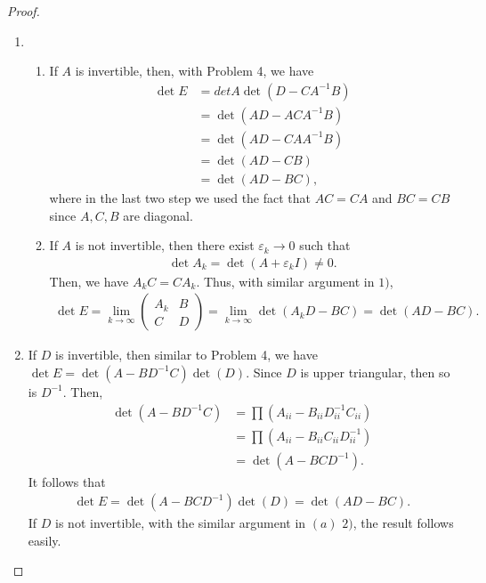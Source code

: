 \documentclass[12pt]{article}
\begin{document}
\begin{proof}
~\begin{enumerate}[label=(\alph*)]
    \item
    \begin{enumerate}[label=\arabic*)]
        \item If $A$ is invertible, then, with Problem 4, we have
        \begin{align*}
            \det E & = det A \det \left( D - C A^{-1} B\right) \\
            & = \det \left(AD - A C A^{-1} B\right) \\
            & = \det \left(AD - C A A^{-1} B\right) \\
            & = \det \left(AD - CB\right)\\
            & = \det \left(AD - BC\right),
        \end{align*}
        where in the last two step we used the fact that $AC = CA$ and $BC = CB$ since $A,C,B$ are diagonal.
        \item If $A$ is not invertible, then there exist $\varepsilon_k \to 0$ such that
        \begin{align*}
            \det A_k = \det (A + \varepsilon_k I) \neq 0.
        \end{align*}
        Then, we have $A_k C = CA_k$. Thus, with similar argument in $1)$,
        \begin{align*}
            \det E = \lim_{k\to \infty} \begin{pmatrix}
            A_k & B \\
            C & D
        \end{pmatrix} = \lim_{k\to\infty} \det \left(A_k D - BC\right) = \det \left(AD - BC\right).
        \end{align*}
    \end{enumerate}

    \item If $D$ is invertible, then similar to Problem 4, we have $\det E = \det (A-BD^{-1}C)\det(D)$. Since $D$ is upper triangular, then so is $D^{-1}$. Then,
    \begin{align*}
        \det (A-BD^{-1}C) & = \prod \left(A_{ii} - B_{ii} D^{-1}_{ii} C_{ii}\right) \\
        & = \prod \left(A_{ii} - B_{ii} C_{ii} D^{-1}_{ii} \right) \\
        & = \det (A-BCD^{-1}).
    \end{align*}
    It follows that
    \begin{align*}
        \det E = \det (A-BCD^{-1})\det(D) = \det (AD - BC).
    \end{align*}
    If $D$ is not invertible, with the similar argument in $(a)\,\,2)$, the result follows easily.


\end{enumerate}
\end{proof}
\end{document}
